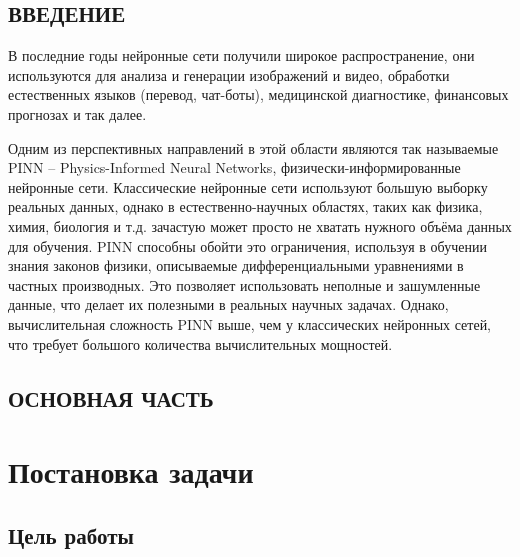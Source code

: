 \documentclass[a4paper,14pt]{extarticle} %
\begin{document}
\newpage
\tableofcontents

% 

\newpage
\begin{center}
    \section*{ВВЕДЕНИЕ}
\end{center}

В последние годы нейронные сети получили широкое распространение, они используются для анализа и генерации изображений и видео, обработки естественных языков (перевод, чат-боты), медицинской диагностике, финансовых прогнозах и так далее.

Одним из перспективных направлений в этой области являются так называемые PINN -- Physics-Informed Neural Networks, физически-инфор\-мированные нейронные сети. Классические нейронные сети используют большую выборку реальных данных, однако в естественно-научных областях, таких как физика, химия, биология и т.д. зачастую может просто не хватать нужного объёма данных для обучения. PINN способны обойти это ограничения, используя в обучении знания законов физики, описываемые дифференциальными уравнениями в частных производных. Это позволяет использовать неполные и зашумленные данные, что делает их полезными в реальных научных задачах. Однако, вычислительная сложность PINN выше, чем у классических нейронных сетей, что требует большого количества вычислительных мощностей.

\newpage
\begin{center}
    \section*{ОСНОВНАЯ ЧАСТЬ}
\end{center}

\section{Постановка задачи}

\subsection{Цель работы}

\end{document}
